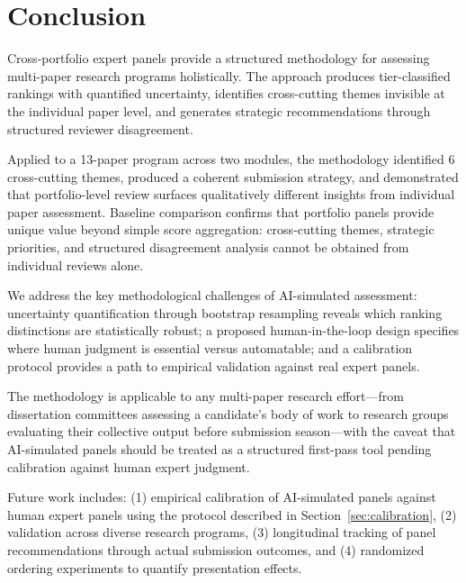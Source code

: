 \section{Conclusion}

Cross-portfolio expert panels provide a structured methodology for assessing multi-paper research programs holistically. The approach produces tier-classified rankings with quantified uncertainty, identifies cross-cutting themes invisible at the individual paper level, and generates strategic recommendations through structured reviewer disagreement.

Applied to a 13-paper program across two modules, the methodology identified 6 cross-cutting themes, produced a coherent submission strategy, and demonstrated that portfolio-level review surfaces qualitatively different insights from individual paper assessment. Baseline comparison confirms that portfolio panels provide unique value beyond simple score aggregation: cross-cutting themes, strategic priorities, and structured disagreement analysis cannot be obtained from individual reviews alone.

We address the key methodological challenges of AI-simulated assessment: uncertainty quantification through bootstrap resampling reveals which ranking distinctions are statistically robust; a proposed human-in-the-loop design specifies where human judgment is essential versus automatable; and a calibration protocol provides a path to empirical validation against real expert panels.

The methodology is applicable to any multi-paper research effort---from dissertation committees assessing a candidate's body of work to research groups evaluating their collective output before submission season---with the caveat that AI-simulated panels should be treated as a structured first-pass tool pending calibration against human expert judgment.

Future work includes: (1) empirical calibration of AI-simulated panels against human expert panels using the protocol described in Section~\ref{sec:calibration}, (2) validation across diverse research programs, (3) longitudinal tracking of panel recommendations through actual submission outcomes, and (4) randomized ordering experiments to quantify presentation effects.
